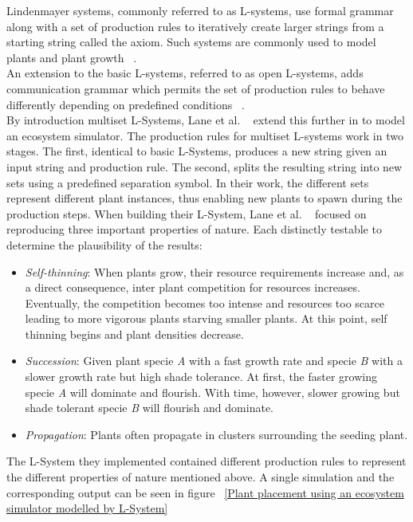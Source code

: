 Lindenmayer systems, commonly referred to as L-systems, use formal grammar along with a set of production rules to iteratively create larger strings from a starting string called the axiom. Such systems are commonly used to model plants and plant growth ~\cite{Prusinkiewicz1990,Deussen2002,Boudon2012,Prusinkiewicz1993}. \\
An extension to the basic L-systems, referred to as open L-systems, adds communication grammar which permits the set of production rules to behave differently depending on predefined conditions ~\cite{Prusinkiewicz1996}.\\ 
By introduction multiset L-Systems, Lane et al. ~\cite{Lane2002} extend this further in to model an ecosystem simulator. The production rules for multiset L-systems work in two stages. The first, identical to basic L-Systems, produces a new string given an input string and production rule. The second, splits the resulting string into new sets using a predefined separation symbol. In their work, the different sets represent different plant instances, thus enabling new plants to spawn during the production steps. When building their L-System, Lane et al. ~\cite{Lane2002} focused on reproducing three important properties of nature. Each distinctly testable to determine the plausibility of the results:
\begin{itemize}
\item \textit{Self-thinning}: When plants grow, their resource requirements increase and, as a direct consequence, inter plant competition for resources increases. Eventually, the competition becomes too intense and resources too scarce leading to more vigorous plants starving smaller plants. At this point, self thinning begins and plant densities decrease.
\item \textit{Succession}: Given plant specie \textit{A} with a fast growth rate and specie \textit{B} with a slower growth rate but high shade tolerance. At first, the faster growing specie \textit{A} will dominate and flourish. With time, however, slower growing but shade tolerant specie \textit{B} will flourish and dominate.
\item \textit{Propagation}: Plants often propagate in clusters surrounding the seeding plant.
\end{itemize}

The L-System they implemented contained different production rules to represent the different properties of nature mentioned above. A single simulation and the corresponding output can be seen in figure ~\ref{Plant placement using an ecosystem simulator modelled by L-System}

